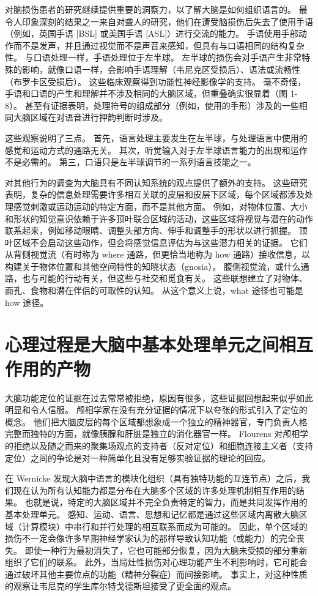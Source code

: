 对脑损伤患者的研究继续提供重要的洞察力，以了解大脑是如何组织语言的。 最令人印象深刻的结果之一来自对聋人的研究，他们在遭受脑损伤后失去了使用手语（例如，英国手语 [BSL] 或美国手语 [ASL]）进行交流的能力。 手语使用手部动作而不是发声，并且通过视觉而不是声音来感知，但具有与口语相同的结构复杂性。 与口语处理一样，手语处理位于左半球。 左半球的损伤会对手语产生非常特殊的影响，就像口语一样，会影响手语理解（韦尼克区受损后）、语法或流畅性（布罗卡区受损后）。 这些临床观察得到功能性神经影像学的支持。 毫不奇怪，手语和口语的产生和理解并不涉及相同的大脑区域，但重叠确实很显着（图 1-8）。 甚至有证据表明，处理符号的组成部分（例如，使用的手形）涉及的一些相同大脑区域在对语音进行押韵判断时涉及。

这些观察说明了三点。 首先，语言处理主要发生在左半球，与处理语言中使用的感觉和运动方式的通路无关。 其次，听觉输入对于左半球语言能力的出现和运作不是必需的。 第三，口语只是左半球调节的一系列语言技能之一。

对其他行为的调查为大脑具有不同认知系统的观点提供了额外的支持。 这些研究表明，复杂的信息处理需要许多相互关联的皮层和皮层下区域，每个区域都涉及处理感觉刺激或运动运动的特定方面，而不是其他方面。 例如，对物体位置、大小和形状的知觉意识依赖于许多顶叶联合区域的活动，这些区域将视觉与潜在的动作联系起来，例如移动眼睛、调整头部方向、伸手和调整手的形状以进行抓握。 顶叶区域不会启动这些动作，但会将感觉信息评估为与这些潜力相关的证据。 它们从背侧视觉流（有时称为 where 通路，但更恰当地称为 how 通路）接收信息，以构建关于物体位置和其他空间特性的知晓状态（gnosia）。 腹侧视觉流，或什么通路，也与可能的行动有关，但这些与社交和觅食有关。 这些联想建立了对物体、面孔、食物和潜在伴侣的可取性的认知。 从这个意义上说，what 途径也可能是 how 途径。


\section{心理过程是大脑中基本处理单元之间相互作用的产物}

大脑功能定位的证据在过去常常被拒绝，原因有很多，这些证据回想起来似乎如此明显和令人信服。 颅相学家在没有充分证据的情况下以夸张的形式引入了定位的概念。 他们把大脑皮层的每个区域都想象成一个独立的精神器官，专门负责人格完整而独特的方面，就像胰腺和肝脏是独立的消化器官一样。 Flourens 对颅相学的拒绝以及随之而来的聚集场观点的支持者（反对定位）和细胞连接主义者（支持定位）之间的争论是对一种简单化且没有足够实验证据的理论的回应。

在 Wernicke 发现大脑中语言的模块化组织（具有独特功能的互连节点）之后，我们现在认为所有认知能力都是分布在大脑多个区域的许多处理机制相互作用的结果。 也就是说，特定的大脑区域并不完全负责特定的智力，而是共同发挥作用的基本处理单元。 感知、运动、语言、思想和记忆都是通过这些区域内离散大脑区域（计算模块）中串行和并行处理的相互联系而成为可能的。 因此，单个区域的损伤不一定会像许多早期神经学家认为的那样导致认知功能（或能力）的完全丧失。 即使一种行为最初消失了，它也可能部分恢复，因为大脑未受损的部分重新组织了它们的联系。 此外，当局灶性损伤对心理功能产生不利影响时，它可能会通过破坏其他主要位点的功能（精神分裂症）而间接影响。 事实上，对这种性质的观察让韦尼克的学生库尔特戈德斯坦接受了更全面的观点。

